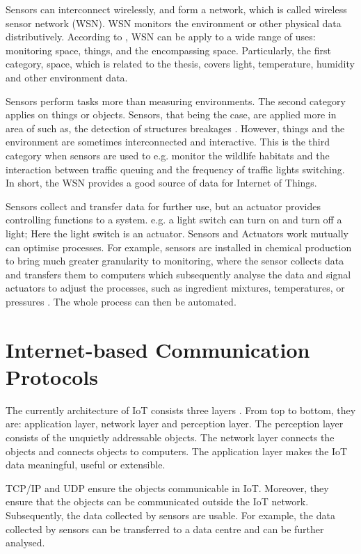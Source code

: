 Sensors can interconnect wirelessly, and form a network, which is called wireless sensor network (WSN). WSN monitors the environment or other physical data distributively. According to \cite{culler2004guest}, WSN can be apply to a wide range of uses: monitoring space, things, and the encompassing space. Particularly, the first category, space, which is related to the thesis, covers light, temperature, humidity and other environment data. 

Sensors perform tasks more than measuring environments. The second category applies on things or objects. Sensors, that being the case, are applied more in area of such as, the detection of structures breakages \cite{christin2009wireless}. However, things and the environment are sometimes interconnected and interactive. This is the third category when sensors are used to e.g. monitor the wildlife habitats \cite{culler2004guest} and the interaction between traffic queuing and the frequency of traffic lights switching. In short, the WSN provides a good source of data for Internet of Things.

Sensors collect and transfer data for further use, but an actuator provides controlling functions to a system. e.g. a light switch can turn on and turn off a light; Here the light switch is an actuator. Sensors and Actuators work mutually can optimise processes. For example, sensors are installed in chemical production to bring much greater granularity to monitoring, where the sensor collects data and transfers them to computers which subsequently analyse the data and signal actuators to adjust the processes, such as ingredient mixtures, temperatures, or pressures \cite{chui2010internet}. The whole process can then be automated. 

\section{Internet-based Communication Protocols}
The currently architecture of IoT consists three layers \cite{wu2010research}. From top to bottom, they are: application layer, network layer and perception layer. The perception layer consists of the unquietly addressable objects. The network layer connects the objects and connects objects to computers. The application layer makes the IoT data meaningful, useful or extensible.

TCP/IP and UDP ensure the objects communicable in IoT. Moreover, they ensure that the objects can be communicated outside the IoT network. Subsequently, the data collected by sensors are usable. For example, the data collected by sensors can be transferred to a data centre and can be further analysed. 

